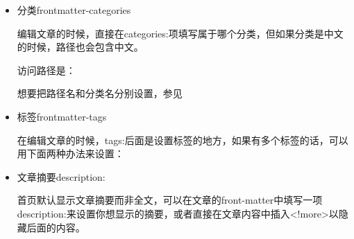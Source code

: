 \documentclass[letterpaper,12pt,english]{sphinxmanual}
\begin{document}
\begin{sphinxVerbatim}[commandchars=\\\{\}]
 
  
 
 
 
 
 
 
\end{sphinxVerbatim}
\begin{itemize}
\item {} 
分类frontmatter-categories

\label{\detokenize{001software/001install/001._u7f51_u7ad9/hexo:frontmatter-categories}}
编辑文章的时候，直接在categories:项填写属于哪个分类，但如果分类是中文的时候，路径也会包含中文。

访问路径是：


想要把路径名和分类名分别设置，参见 {\hyperref[\detokenize{001software/001install/001._u7f51_u7ad9/hexo:id20}]{}}

\item {} 
标签frontmatter-tags

\label{\detokenize{001software/001install/001._u7f51_u7ad9/hexo:frontmatter-tags}}
在编辑文章的时候，tags:后面是设置标签的地方，如果有多个标签的话，可以用下面两种办法来设置：

\begin{sphinxVerbatim}[commandchars=\\\{\}]
 \PYG{p}{[}\PYG{p}{]}

 
 
 
\end{sphinxVerbatim}

\item {} 
文章摘要description:

首页默认显示文章摘要而非全文，可以在文章的front-matter中填写一项description:来设置你想显示的摘要，或者直接在文章内容中插入\textless{}!\textendash{}more\textendash{}\textgreater{}以隐藏后面的内容。


\end{itemize}
\end{document}
